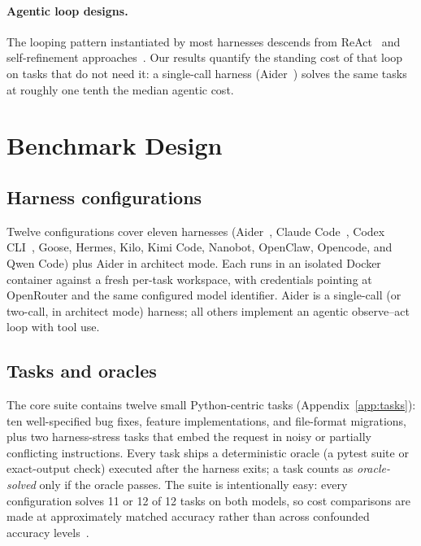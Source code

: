 \documentclass[11pt]{article}
\newcommand{\harness}[1]{\textsf{#1}}
\begin{document}
\paragraph{Agentic loop designs.}
The looping pattern instantiated by most harnesses descends from ReAct~\citep{yao2023react} and self-refinement approaches~\citep{shinn2023reflexion}. Our results quantify the standing cost of that loop on tasks that do not need it: a single-call harness (Aider~\citep{aider}) solves the same tasks at roughly one tenth the median agentic cost.

\section{Benchmark Design}
\label{sec:design}

\subsection{Harness configurations}
Twelve configurations cover eleven harnesses (\harness{Aider}~\citep{aider}, \harness{Claude Code}~\citep{claudecode}, \harness{Codex CLI}~\citep{codexcli}, \harness{Goose}, \harness{Hermes}, \harness{Kilo}, \harness{Kimi Code}, \harness{Nanobot}, \harness{OpenClaw}, \harness{Opencode}, and \harness{Qwen Code}) plus \harness{Aider} in architect mode. Each runs in an isolated Docker container against a fresh per-task workspace, with credentials pointing at OpenRouter and the same configured model identifier. Aider is a single-call (or two-call, in architect mode) harness; all others implement an agentic observe--act loop with tool use.

\subsection{Tasks and oracles}
The core suite contains twelve small Python-centric tasks (Appendix~\ref{app:tasks}): ten well-specified bug fixes, feature implementations, and file-format migrations, plus two harness-stress tasks that embed the request in noisy or partially conflicting instructions. Every task ships a deterministic oracle (a pytest suite or exact-output check) executed after the harness exits; a task counts as \emph{oracle-solved} only if the oracle passes. The suite is intentionally easy: every configuration solves 11 or 12 of 12 tasks on both models, so cost comparisons are made at approximately matched accuracy rather than across confounded accuracy levels~\citep{kapoor2024agents}.
\end{document}
